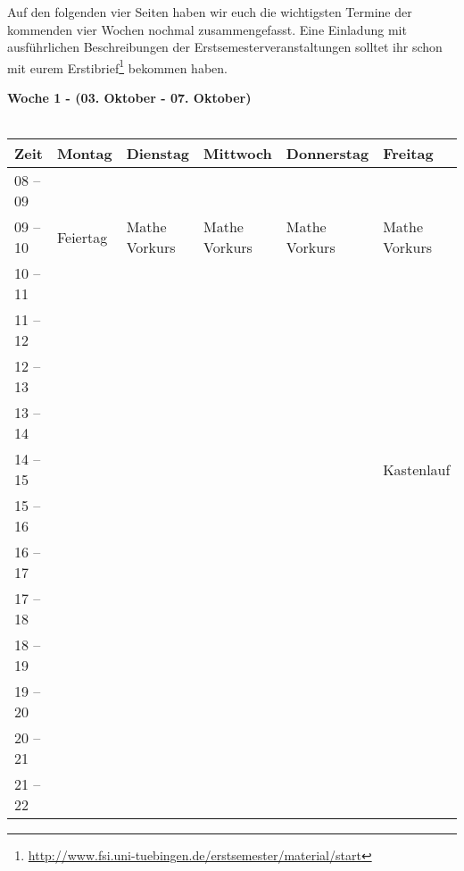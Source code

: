 Auf den folgenden vier Seiten haben wir euch die wichtigsten Termine der kommenden vier Wochen nochmal zusammengefasst. Eine Einladung mit ausführlichen Beschreibungen der Erstsemesterveranstaltungen solltet ihr schon mit eurem Erstibrief\footnote{\url{http://www.fsi.uni-tuebingen.de/erstsemester/material/start}} bekommen haben.
\vfill




\textbf{Woche 1 - (03. Oktober - 07. Oktober)}\\
\\
\begin{tabular}{|l|p{}|p{}|p{}|p{}|p{}|} \hline
 Zeit & Montag & Dienstag & Mittwoch & Donnerstag & Freitag \\ 
 \hline \hline
 08 -- 09 & & & & & \\ \cline{1-1} 
\cline{2-6}
 09 -- 10 &\footnotesize{Feiertag} & \footnotesize{Mathe Vorkurs} &\footnotesize{Mathe Vorkurs} & \footnotesize{Mathe Vorkurs} & \footnotesize{Mathe Vorkurs} \\ \cline{1-1}
 10 -- 11 & & & & & \\ \cline{1-1}
 11 -- 12 & & & & & \\ \cline{1-1}
 12 -- 13 & & & & & \\ \cline{1-1} 
 13 -- 14 & & & & & \\ \cline{1-1} \cline{6-6}
 14 -- 15 & & & & & \cellcolor{lightlightgray} \footnotesize{Kastenlauf}\\ \cline{1-1}
 15 -- 16 & & & & & \ \cellcolor{lightlightgray} \\ \cline{1-5}
 16 -- 17 & & & & &  \cellcolor{lightlightgray}\\ \cline{1-1}
 17 -- 18 & & & & & \cellcolor{lightlightgray}\\ \cline{1-1} \cline{6-6}	
 18 -- 19 & & & & & \\ \cline{1-1}
 19 -- 20 & & & & &   \\ \cline{1-1}
 20 -- 21 & & & &  &  \\ \cline{1-1}
 21 -- 22 & & & & & \\ \hline
 \end{tabular}
\vfil

